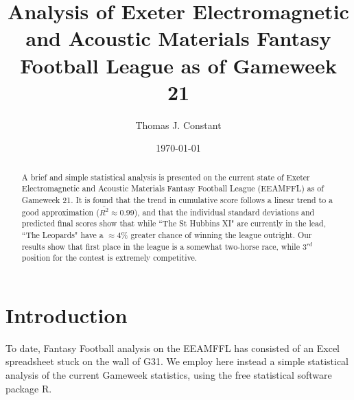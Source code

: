 \documentclass[aps,prl,twocolumn,showpacs,superscriptaddress,groupedaddress]{revtex4}  %
\begin{document}
\widetext



\title{Analysis of Exeter Electromagnetic and Acoustic Materials Fantasy Football League as of Gameweek 21}

\author{Thomas J. Constant}

\date{\today}


\begin{abstract}
A brief and simple statistical analysis is presented on the current state of Exeter Electromagnetic and Acoustic Materials Fantasy Football League (EEAMFFL) as of Gameweek 21. It is found that the trend in cumulative score follows a linear trend to a good approximation ($\bar{R^2}\approx 0.99$), and that the individual standard deviations and predicted final scores show that while ``The St Hubbins XI" are currently in the lead, ``The Leopards" have a $\approx4$\% greater chance of winning the league outright. Our results show that first place in the league is a somewhat two-horse race, while  $3^{rd}$ position for the contest is extremely competitive.
\end{abstract}

\pacs{}
\maketitle

\section{Introduction}

To date, Fantasy Football analysis on the EEAMFFL has consisted of an Excel spreadsheet stuck on the wall of G31. We employ here instead a simple statistical analysis of the current Gameweek statistics, using the free statistical software package R.
\end{document}
